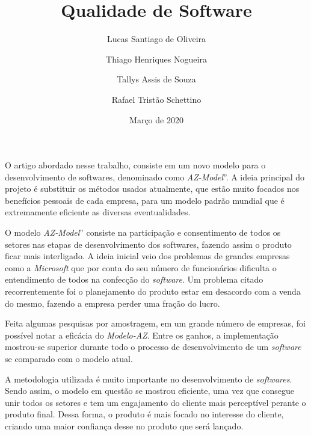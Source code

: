 \documentclass{article}
\title{Qualidade de Software}
\author{
        Lucas Santiago de Oliveira\and
        Thiago Henriques Nogueira\and 
        Tallys Assis de Souza\and 
        Rafael Tristão Schettino
    }
\date{Março de 2020}
\begin{document}
\maketitle

\hspace{6pt} O artigo abordado nesse trabalho, consiste em um novo modelo para o desenvolvimento de softwares, denominado como \emph{AZ-Model}''. A ideia principal do projeto é substituir os métodos usados atualmente, que estão muito focados nos benefícios pessoais de cada empresa, para um modelo padrão mundial que é extremamente eficiente as diversas eventualidades.

\hspace{6pt} O modelo \emph{AZ-Model}'' consiste na participação e consentimento de todos os setores nas etapas de desenvolvimento dos softwares, fazendo assim o produto ficar mais interligado. A ideia inicial veio dos problemas de grandes empresas como a \emph{Microsoft} que por conta do seu número de funcionários dificulta o entendimento de todos na confecção do \emph{software}. Um problema citado recorrentemente foi o planejamento do produto estar em desacordo com a venda do mesmo, fazendo a empresa perder uma fração do lucro. 

\hspace{6pt} Feita algumas pesquisas por amostragem, em um grande número de empresas, foi possível notar a eficácia do \emph{Modelo-AZ}. Entre os ganhos, a implementação mostrou-se superior durante todo o processo de desenvolvimento de um \emph{software} se comparado com o modelo atual.

\hspace{6pt} A metodologia utilizada é muito importante no desenvolvimento de \emph{softwares}. Sendo assim, o modelo em questão se mostrou eficiente, uma vez que consegue unir todos os setores e tem um engajamento do cliente mais perceptível perante o produto final. Dessa forma, o produto é mais focado no interesse do cliente, criando uma maior confiança desse no produto que será lançado.
\end{document}
